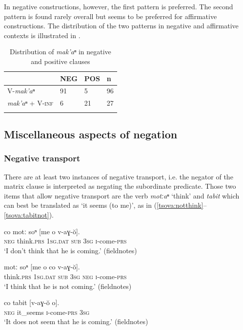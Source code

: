 \documentclass[output=paper,%
colorlinks,citecolor=brown,
showindex
]{langscibook}
\begin{document}
In negative constructions, however, the first pattern is preferred. The second pattern is found rarely overall but seems to be preferred for affirmative constructions. The distribution of the two patterns in negative and affirmative contexts is illustrated in .

\begin{table}
\caption{Distribution of \textit{mak’aⁿ } in negative and positive clauses}
\label{tsova:tab:mak}
\begin{tabular}{llll} 
\lsptoprule
                                    & NEG   & POS  & n  \\ \midrule
V-\textit{mak'aⁿ}                   & 91    & 5    & 96 \\
\textit{mak'aⁿ} + V-\textsc{inf}    & 6     & 21   & 27   \\ 
\lspbottomrule
\end{tabular}
\end{table}

\subsection{Miscellaneous aspects of negation}
\subsubsection{Negative transport}

There are at least two instances of negative transport, i.e.  the negator of the matrix clause is interpreted as negating the subordinate predicate. Those two items that allow negative transport are the verb \textit{motːaⁿ} `think' and \textit{tabit} which can best be translated as `it seems (to me)', as in (\ref{tsova:notthink}--\ref{tsova:tabitnot}). 

\ea	\label{tsova:notthink}
\gll 	co motː soⁿ [me o v-aɣ-ŏ].\\  
	\textsc{neg} think\textsc{.prs}  \textsc{1sg.dat} \textsc{sub}  \textsc{3sg}  \textsc{i}-come-\textsc{prs}\\
\glt `I don't think that he is coming.' (fieldnotes)
\z

\ea	\label{tsova:thinknot}
\gll 	motː soⁿ [me o co v-aɣ-ŏ].\\  
	think\textsc{.prs} \textsc{1sg.dat} \textsc{sub}	\textsc{3sg} \textsc{neg} \textsc{i}-come-\textsc{prs}\\
\glt `I think that he is not coming.' (fieldnotes)
\z

\ea	\label{tsova:tabit}
\gll 	co tabit [v-aɣ-ŏ o].\\  
	\textsc{neg} it\_seems \textsc{i}-come-\textsc{prs} \textsc{3sg}\\
\glt `It does not seem that he is coming.' (fieldnotes)
\z
\end{document}
